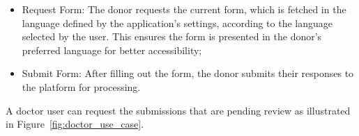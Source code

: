 \begin{itemize}
	\item Request Form: The donor requests the current form, which is fetched in the language defined by the application's settings, according to the language selected by the user. This ensures the form is presented in the donor's preferred language for better accessibility;
	\item Submit Form: After filling out the form, the donor submits their responses to the platform for processing.
\end{itemize}


\newpage

A doctor user can request the submissions that are pending review as illustrated in Figure~\ref{fig:doctor_use_case}.

\begin{figure}[h]
	\begin{center}

\end{center}
\end{figure}
